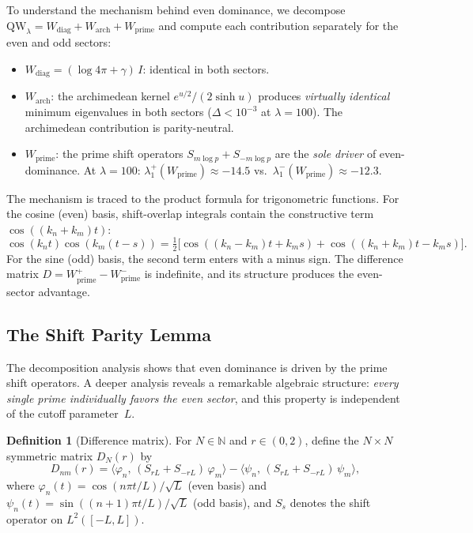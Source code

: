 \documentclass[12pt,a4paper]{article}
\theoremstyle{definition}
\newtheorem{definition}[theorem]{Definition}
\theoremstyle{remark}
\begin{document}
To understand the mechanism behind even dominance, we decompose $\mathrm{QW}_\lambda = W_{\mathrm{diag}} + W_{\mathrm{arch}} + W_{\mathrm{prime}}$ and compute each contribution separately for the even and odd sectors:

\begin{itemize}
  \item $W_{\mathrm{diag}} = (\log 4\pi + \gamma)\,I$: identical in both sectors.
  \item $W_{\mathrm{arch}}$: the archimedean kernel $e^{u/2}/(2\sinh u)$ produces \emph{virtually identical} minimum eigenvalues in both sectors ($\Delta < 10^{-3}$ at $\lambda = 100$). The archimedean contribution is parity-neutral.
  \item $W_{\mathrm{prime}}$: the prime shift operators $S_{m\log p} + S_{-m\log p}$ are the \emph{sole driver} of even-dominance. At $\lambda = 100$: $\lambda_1^+(W_{\mathrm{prime}}) \approx -14.5$ vs.\ $\lambda_1^-(W_{\mathrm{prime}}) \approx -12.3$.
\end{itemize}

The mechanism is traced to the product formula for trigonometric functions. For the cosine (even) basis, shift-overlap integrals contain the constructive term $\cos((k_n + k_m)t)$:
\[
  \cos(k_n t)\cos(k_m(t-s)) = \tfrac{1}{2}\bigl[\cos((k_n-k_m)t + k_m s) + \cos((k_n+k_m)t - k_m s)\bigr].
\]
For the sine (odd) basis, the second term enters with a minus sign. The difference matrix $D = W_{\mathrm{prime}}^+ - W_{\mathrm{prime}}^-$ is indefinite, and its structure produces the even-sector advantage.

\subsection{The Shift Parity Lemma}
\label{sec:shift-parity}

The decomposition analysis shows that even dominance is driven by the prime shift operators. A deeper analysis reveals a remarkable algebraic structure: \emph{every single prime individually favors the even sector}, and this property is independent of the cutoff parameter~$L$.

\begin{definition}[Difference matrix]
\label{def:D-matrix}
For $N \in \mathbb{N}$ and $r \in (0,2)$, define the $N \times N$ symmetric matrix $D_N(r)$ by
\[
  D_{nm}(r) = \langle \varphi_n,\, (S_{rL} + S_{-rL})\,\varphi_m \rangle
            - \langle \psi_n,\, (S_{rL} + S_{-rL})\,\psi_m \rangle,
\]
where $\varphi_n(t) = \cos(n\pi t/L)/\sqrt{L}$ (even basis) and $\psi_n(t) = \sin((n+1)\pi t/L)/\sqrt{L}$ (odd basis), and $S_s$ denotes the shift operator on $L^2([-L,L])$.
\end{definition}
\end{document}
